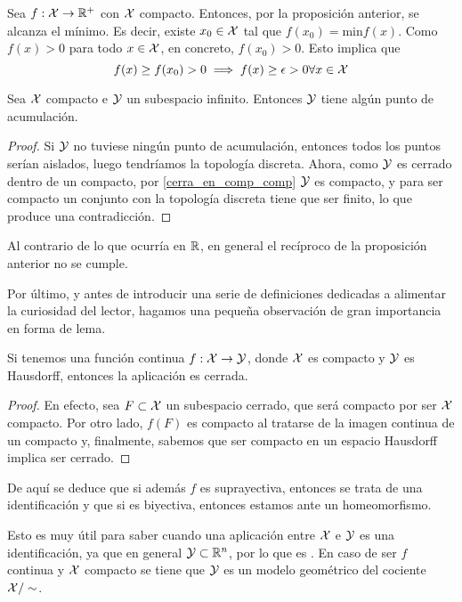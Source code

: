 \begin{obs}
	Sea $f:\mathcal{X}\rightarrow \mathbb{R}^+$ con $\mathcal{X}$ compacto. Entonces, por la proposición anterior, se alcanza el mínimo. Es decir, existe $x_0\in\mathcal{X}$ tal que $f(x_0)=\text{min} f(x)$. Como $f(x)>0$ para todo $x\in\mathcal{X}$, en concreto, $f(x_0)>0$. Esto implica que
	\[ f(x)\ge f(x_0)>0\implies f(x)\ge \epsilon>0 \forall x\in\mathcal{X} \]
\end{obs}

\begin{prop}
		Sea $\mathcal{X}$ compacto e $\mathcal{Y}$ un subespacio infinito. Entonces $\mathcal{Y}$ tiene algún punto de acumulación.
	\begin{proof}
		Si $\mathcal{Y}$ no tuviese ningún punto de acumulación, entonces todos los puntos serían aislados, luego tendríamos la topología discreta. Ahora, como $\mathcal{Y}$ es cerrado dentro de un compacto, por \ref{cerra_en_comp_comp} $\mathcal{Y}$ es compacto, y para ser compacto un conjunto con la topología discreta tiene que ser finito, lo que produce una contradicción.
	\end{proof}
\end{prop}

\begin{obs}
	Al contrario de lo que ocurría en $\mathbb{R}$, en general el recíproco de la proposición anterior no se cumple. 
\end{obs}

Por último, y antes de introducir una serie de definiciones dedicadas a alimentar la curiosidad del lector, hagamos una pequeña observación de gran importancia en forma de lema.

\begin{lem}
	Si tenemos una función continua $f: \mathcal{X}\to \mathcal{Y}$, donde $\mathcal{X}$ es compacto y $\mathcal{Y}$ es Hausdorff, entonces la aplicación es cerrada.
\end{lem}
\begin{proof}
	En efecto, sea $F\subset \mathcal{X}$ un subespacio cerrado, que será compacto por ser $\mathcal{X}$ compacto. Por otro lado, $f(F)$ es compacto al tratarse de la imagen continua de un compacto y, finalmente, sabemos que ser compacto en un espacio Hausdorff implica ser cerrado.
\end{proof}

De aquí se deduce que si además $f$ es suprayectiva, entonces se trata de una identificación y que si es biyectiva, entonces estamos ante un homeomorfismo. 

Esto es muy útil para saber cuando una aplicación entre $\mathcal{X}$ e $\mathcal{Y}$ es una identificación, ya que en general $\mathcal{Y}\subset\mathbb{R}^n$, por lo que es \hausdorff. En caso de ser $f$ continua y $\mathcal{X}$ compacto se tiene que $\mathcal{Y}$ es un modelo geométrico del cociente $\mathcal{X}/\sim$.


